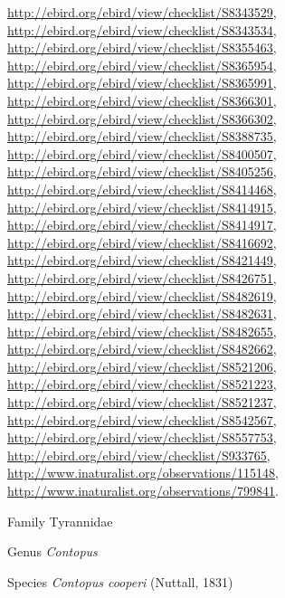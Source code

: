 \documentclass[9pt, article]{memoir}
\begin{document}
\begin{multicols}{2}
\url{http://ebird.org/ebird/view/checklist/S8343529}, 
\url{http://ebird.org/ebird/view/checklist/S8343534}, 
\url{http://ebird.org/ebird/view/checklist/S8355463}, 
\url{http://ebird.org/ebird/view/checklist/S8365954}, 
\url{http://ebird.org/ebird/view/checklist/S8365991}, 
\url{http://ebird.org/ebird/view/checklist/S8366301}, 
\url{http://ebird.org/ebird/view/checklist/S8366302}, 
\url{http://ebird.org/ebird/view/checklist/S8388735}, 
\url{http://ebird.org/ebird/view/checklist/S8400507}, 
\url{http://ebird.org/ebird/view/checklist/S8405256}, 
\url{http://ebird.org/ebird/view/checklist/S8414468}, 
\url{http://ebird.org/ebird/view/checklist/S8414915}, 
\url{http://ebird.org/ebird/view/checklist/S8414917}, 
\url{http://ebird.org/ebird/view/checklist/S8416692}, 
\url{http://ebird.org/ebird/view/checklist/S8421449}, 
\url{http://ebird.org/ebird/view/checklist/S8426751}, 
\url{http://ebird.org/ebird/view/checklist/S8482619}, 
\url{http://ebird.org/ebird/view/checklist/S8482631}, 
\url{http://ebird.org/ebird/view/checklist/S8482655}, 
\url{http://ebird.org/ebird/view/checklist/S8482662}, 
\url{http://ebird.org/ebird/view/checklist/S8521206}, 
\url{http://ebird.org/ebird/view/checklist/S8521223}, 
\url{http://ebird.org/ebird/view/checklist/S8521237}, 
\url{http://ebird.org/ebird/view/checklist/S8542567}, 
\url{http://ebird.org/ebird/view/checklist/S8557753}, 
\url{http://ebird.org/ebird/view/checklist/S933765}, 
\url{http://www.inaturalist.org/observations/115148}, 
\url{http://www.inaturalist.org/observations/799841}.

\vspace{6pt}\noindent\hspace{24pt}Family Tyrannidae


\vspace{6pt}\noindent\hspace{30pt}Genus \textit{Contopus}


\vspace{6pt}\noindent\hspace{36pt}Species \textit{Contopus cooperi} (Nuttall, 1831)



\end{multicols}
\end{document}
